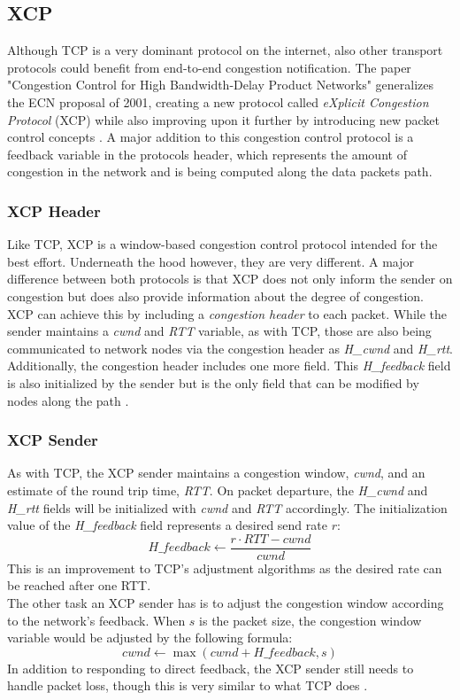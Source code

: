 \documentclass[a4paper,conference]{IEEEtran}
\begin{document}
\subsection{XCP}
Although TCP is a very dominant protocol on the internet, also other transport protocols could benefit from end-to-end congestion notification. The paper "Congestion Control for High Bandwidth-Delay Product Networks"  generalizes the ECN proposal of 2001, creating a new protocol called \textit{eXplicit Congestion Protocol} (XCP) while also improving upon it further by introducing new packet control concepts \cite{katabi2002congestion,1498331}. A major addition to this congestion control protocol is a feedback variable in the protocols header, which represents the amount of congestion in the network and is being computed along the data packets path.

\subsubsection*{XCP Header}
Like TCP, XCP is a window-based congestion control protocol intended for the best effort. Underneath the hood however, they are very different. A major difference between both protocols is that XCP does not only inform the sender on congestion but does also provide information about the degree of congestion. XCP can achieve this by including a \textit{congestion header} to each packet. While the sender maintains a \textit{cwnd} and \textit{RTT} variable, as with TCP, those are also being communicated to network nodes via the congestion header as \textit{H\_cwnd} and \textit{H\_rtt}. Additionally, the congestion header includes one more field. This \textit{H\_feedback} field is also initialized by the sender but is the only field that can be modified by nodes along the path \cite{katabi2002congestion,1498331}.

\subsubsection*{XCP Sender}
As with TCP, the XCP sender maintains a congestion window, \textit{cwnd}, and an estimate of the round trip time, \textit{RTT}. On packet departure, the \textit{H\_cwnd} and \textit{H\_rtt} fields will be initialized with \textit{cwnd} and \textit{RTT} accordingly. The initialization value of the \textit{H\_feedback} field represents a desired send rate $r$:
\[H\_feedback \leftarrow \frac{r \cdot RTT - cwnd}{cwnd}\]
This is an improvement to TCP's adjustment algorithms as the desired rate can be reached after one RTT.\\
The other task an XCP sender has is to adjust the congestion window according to the network's feedback. When $s$ is the packet size, the congestion window variable would be adjusted by the following formula:
\[cwnd \leftarrow \max(cwnd + H\_feedback, s)\]
In addition to responding to direct feedback, the XCP sender still needs to handle packet loss, though this is very similar to what TCP does \cite{katabi2002congestion}.
\end{document}

